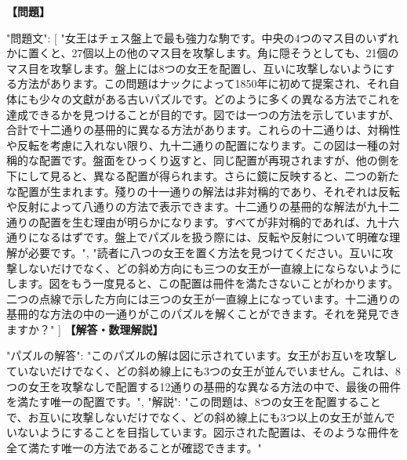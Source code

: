 \documentclass[10pt,a4paper,oneside,openany]{ltjsbook}
\begin{document}
\begin{tcolorbox}[colback=softblue,colframe=primaryblue,title=\textbf{第 300 問：THE EIGHT QUEENS.},arc=2mm,boxrule=1pt,breakable]
\textbf{【問題】}\par\vspace{0.3em}
{
    "問題文": [
        "女王はチェス盤上で最も強力な駒です。中央の4つのマス目のいずれかに置くと、27個以上の他のマス目を攻撃します。角に隠そうとしても、21個のマス目を攻撃します。盤上には8つの女王を配置し、互いに攻撃しないようにする方法があります。この問題はナックによって1850年に初めて提案され、それ自体にも少々の文獻がある古いパズルです。どのように多くの異なる方法でこれを達成できるかを見つけることが目的です。図では一つの方法を示していますが、合計で十二通りの基冊的に異なる方法があります。これらの十二通りは、対稱性や反転を考慮に入れない限り、九十二通りの配置になります。この図は一種の対稱的な配置です。盤面をひっくり返すと、同じ配置が再現されますが、他の側を下にして見ると、異なる配置が得られます。さらに鏡に反映すると、二つの新たな配置が生まれます。殘りの十一通りの解法は非対稱的であり、それぞれは反転や反射によって八通りの方法で表示できます。十二通りの基冊的な解法が九十二通りの配置を生む理由が明らかになります。すべてが非対稱的であれば、九十六通りになるはずです。盤上でパズルを扱う際には、反転や反射について明確な理解が必要です。",
        "読者に八つの女王を置く方法を見つけてください。互いに攻撃しないだけでなく、どの斜め方向にも三つの女王が一直線上にならないようにします。図をもう一度見ると、この配置は冊件を満たさないことがわかります。二つの点線で示した方向には三つの女王が一直線上になっています。十二通りの基冊的な方法の中の一通りがこのパズルを解くことができます。それを発見できますか？"
    ]
}
\tcblower
\textbf{【解答・数理解説】}\par\vspace{0.3em}
{
"パズルの解答": "このパズルの解は図に示されています。女王がお互いを攻撃していないだけでなく、どの斜め線上にも3つの女王が並んでいません。これは、8つの女王を攻撃なしで配置する12通りの基冊的な異なる方法の中で、最後の冊件を満たす唯一の配置です。",
"解説": "この問題は、8つの女王を配置することで、お互いに攻撃しないだけでなく、どの斜め線上にも3つ以上の女王が並んでいないようにすることを目指しています。図示された配置は、そのような冊件を全て満たす唯一の方法であることが確認できます。"
}
\end{tcolorbox}
\end{document}
